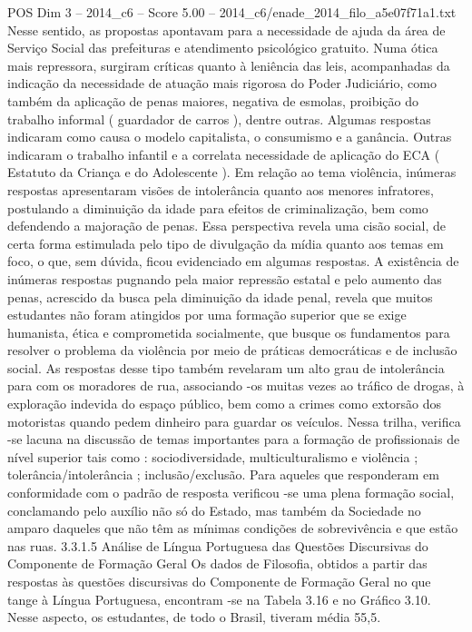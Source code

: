 \begin{textsample}{POS Dim 3 – 2014\_c6 – Score 5.00 – 2014\_c6/enade\_2014\_filo\_a5e07f71a1.txt}
Nesse sentido, as propostas apontavam para a necessidade de ajuda da área de Serviço Social das prefeituras e atendimento psicológico gratuito.
Numa ótica mais repressora, surgiram críticas quanto à leniência das leis, acompanhadas da indicação da necessidade de atuação mais rigorosa do Poder Judiciário, como também da aplicação de penas maiores, negativa de esmolas, proibição do trabalho informal ( guardador de carros ), dentre outras.
Algumas respostas indicaram como causa o modelo capitalista, o consumismo e a ganância.
Outras indicaram o trabalho infantil e a correlata necessidade de aplicação do ECA ( Estatuto da Criança e do Adolescente ).
Em relação ao tema violência, inúmeras respostas apresentaram visões de intolerância quanto aos menores infratores, postulando a diminuição da idade para efeitos de criminalização, bem como defendendo a majoração de penas.
Essa perspectiva revela uma cisão social, de certa forma estimulada pelo tipo de divulgação da mídia quanto aos temas em foco, o que, sem dúvida, ficou evidenciado em algumas respostas.
A existência de inúmeras respostas pugnando pela maior repressão estatal e pelo aumento das penas, acrescido da busca pela diminuição da idade penal, revela que muitos estudantes não foram atingidos por uma formação superior que se exige humanista, ética e comprometida socialmente, que busque os fundamentos para resolver o problema da violência por meio de práticas democráticas e de inclusão social.
As respostas desse tipo também revelaram um alto grau de intolerância para com os moradores de rua, associando -os muitas vezes ao tráfico de drogas, à exploração indevida do espaço público, bem como a crimes como extorsão dos motoristas quando pedem dinheiro para guardar os veículos.
Nessa trilha, verifica -se lacuna na discussão de temas importantes para a formação de profissionais de nível superior tais como : sociodiversidade, multiculturalismo e violência ; tolerância/intolerância ; inclusão/exclusão.
Para aqueles que responderam em conformidade com o padrão de resposta verificou -se uma plena formação social, conclamando pelo auxílio não só do Estado, mas também da Sociedade no amparo daqueles que não têm as mínimas condições de sobrevivência e que estão nas ruas. 3.3.1.5 Análise de Língua Portuguesa das Questões Discursivas do Componente de Formação Geral Os dados de Filosofia, obtidos a partir das respostas às questões discursivas do Componente de Formação Geral no que tange à Língua Portuguesa, encontram -se na Tabela 3.16 e no Gráfico 3.10.
Nesse aspecto, os estudantes, de todo o Brasil, tiveram média 55,5.

\end{textsample}

